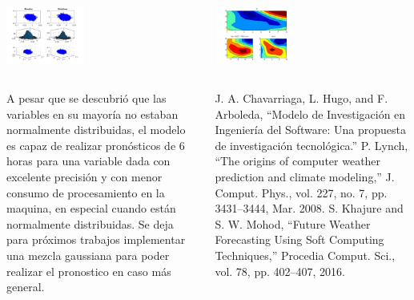 \documentclass[25pt, portrait]{tikzposter}
\begin{document}
\begin{columns}
    {
        \begin{tikzfigure}
            \includegraphics[width=0.4\textwidth]{images/probabilidad.jpg}
        \end{tikzfigure}
    }
    {
        \begin{tikzfigure}
            \includegraphics[width=0.4\textwidth]{images/untitled.jpg}
        \end{tikzfigure}
    }
\end{columns}

\begin{columns}
    {
        A pesar que se descubrió que las variables en su mayoría no estaban normalmente distribuidas, el modelo es capaz de realizar pronósticos de 6 horas para una variable dada con excelente precisión y con menor consumo de procesamiento en la maquina, en especial cuando están normalmente distribuidas. Se deja para próximos trabajos implementar una mezcla gaussiana para poder realizar el pronostico en caso más general. 
    }
    {
        \renewcommand{\section}[2]{}%
        \begin{thebibliography}{}
        
        \bibitem  J. A. Chavarriaga, L. Hugo, and F. Arboleda, “Modelo de Investigación en Ingeniería del Software: Una propuesta de investigación tecnológica.”
        \bibitem  P. Lynch, “The origins of computer weather prediction and climate modeling,” J. Comput. Phys., vol. 227, no. 7, pp. 3431–3444, Mar. 2008.
        \bibitem  S. Khajure and S. W. Mohod, “Future Weather Forecasting Using Soft Computing Techniques,” Procedia Comput. Sci., vol. 78, pp. 402–407, 2016.
        \end{thebibliography}
    }
\end{columns}
\end{document}
